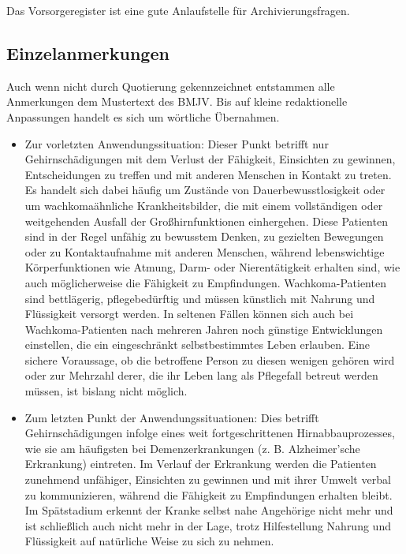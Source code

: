 \documentclass[pdftex,12pt,a4paper]{article}
\begin{document}
  
Das Vorsorgeregister ist eine gute Anlaufstelle für Archivierungsfragen.   


\subsection*{Einzelanmerkungen}

Auch wenn nicht durch Quotierung gekennzeichnet entstammen
alle Anmerkungen dem Mustertext des BMJV. Bis auf kleine redaktionelle
Anpassungen handelt es sich um wörtliche Übernahmen.

\begin{itemize}

\item Zur vorletzten Anwendungssituation: Dieser Punkt betrifft nur Gehirnschädigungen mit dem Verlust der Fähigkeit, Einsichten zu gewinnen, Entscheidungen
zu treffen und mit anderen Menschen in Kontakt zu treten. Es handelt sich dabei häufig um Zustände von
Dauerbewusstlosigkeit oder um wachkomaähnliche Krankheitsbilder, die mit einem vollständigen oder weitgehenden
Ausfall der Großhirnfunktionen einhergehen. Diese Patienten sind in der Regel unfähig zu bewusstem
Denken, zu gezielten Bewegungen oder zu Kontaktaufnahme mit anderen Menschen, während lebenswichtige
Körperfunktionen wie Atmung, Darm- oder Nierentätigkeit erhalten sind, wie auch möglicherweise die Fähigkeit zu
Empfindungen. Wachkoma-Patienten sind bettlägerig, pflegebedürftig und müssen künstlich mit
Nahrung und Flüssigkeit versorgt werden. In seltenen Fällen können sich auch bei Wachkoma-Patienten nach mehreren
Jahren noch günstige Entwicklungen einstellen, die ein eingeschränkt selbstbestimmtes Leben erlauben. Eine sichere
Voraussage, ob die betroffene Person zu diesen wenigen gehören wird oder zur Mehrzahl derer, die ihr Leben lang als
Pflegefall betreut werden müssen, ist bislang nicht möglich.

\item Zum letzten Punkt der Anwendungssituationen: Dies betrifft Gehirnschädigungen infolge eines weit fortgeschrittenen Hirnabbauprozesses, wie sie am häufigsten bei Demenzerkrankungen (z. B. Alzheimer’sche Erkrankung) eintreten. Im Verlauf der Erkrankung werden die Patienten zunehmend unfähiger, Einsichten zu gewinnen und mit ihrer Umwelt verbal zu kommunizieren, während die Fähigkeit zu Empfindungen erhalten bleibt. Im Spätstadium erkennt der Kranke selbst nahe Angehörige nicht mehr und ist schließlich auch nicht mehr in der Lage, trotz Hilfestellung Nahrung und Flüssigkeit auf natürliche Weise zu sich zu nehmen.


\end{itemize}
\end{document}
